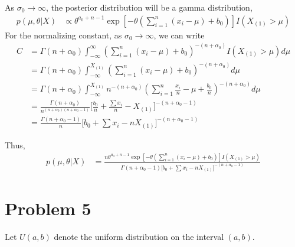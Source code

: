 \begin{itemize}
\begin{itemize}
As $\sigma_0 \rightarrow \infty$, the posterior distribution will be a gamma distribution,
\begin{align*}
	p(\mu, \theta|X)& \propto \theta^{a_0+n-1} \exp[-\theta (\sum_{i=1}^n (x_i-\mu)  + b_0)] I(X_{(1)}>\mu) 
\end{align*}
For the normalizing constant, as $\sigma_0 \rightarrow \infty$, we can write
\begin{align*}
	C&= \Gamma(n + \alpha_0) \int_{-\infty}^{\infty} (\sum_{i=1}^n (x_i-\mu)  + b_0)^{-(n+\alpha_0)} I(X_{(1)}>\mu) d\mu\\
	& = \Gamma(n + \alpha_0) \int_{-\infty}^{X_{(1)}} (\sum_{i=1}^n (x_i-\mu)  + b_0)^{-(n+\alpha_0)} d \mu \\
	& = \Gamma(n + \alpha_0) \int_{-\infty}^{X_{(1)}} n^{-(n+\alpha_0)} (\sum_{i=1}^n \frac{x_i}{n}- \mu  + \frac{b_0}{n})^{-(n+\alpha_0)} d \mu \\
	&= \frac{\Gamma(n + \alpha_0)}{n^{(n+\alpha_0) (n + \alpha_0 -1)}} \Big[ \frac{b_0}{n} + \frac{\sum x_i}{n} - X_{(1)} \Big]^{-(n+ \alpha_0 -1)}  \\
	&=  \frac{\Gamma(n + \alpha_0 -1)}{n}  \Big[b_0 + {\sum x_i}- n X_{(1)} \Big]^{-(n+ \alpha_0 -1)} 
\end{align*}

Thus, 
\begin{align*}
	p(\mu, \theta|X)& = \frac{n \theta^{a_0+n-1} \exp[-\theta (\sum_{i=1}^n (x_i-\mu)  + b_0)] I(X_{(1)}>\mu) }{\Gamma(n + \alpha_0 -1) \Big[b_0 + {\sum x_i}- n X_{(1)} \Big]^{-(n+ \alpha_0 -1)}} 
\end{align*}

\end{itemize}

\end{itemize}

\section{Problem 5}
Let $U(a, b)$ denote the uniform distribution on the interval $(a, b)$. 

